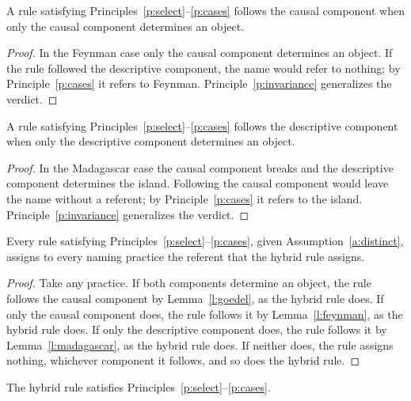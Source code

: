 \documentclass{situationist-preprint}
\begin{document}
\begin{lemma}\label{l:feynman}
A rule satisfying Principles~\ref{p:select}--\ref{p:cases} follows the causal component when only the causal component determines an object.
\end{lemma}

\begin{proof}
In the Feynman case only the causal component determines an object. If the rule followed the descriptive component, the name would refer to nothing; by Principle~\ref{p:cases} it refers to Feynman. Principle~\ref{p:invariance} generalizes the verdict.
\end{proof}

\begin{lemma}\label{l:madagascar}
A rule satisfying Principles~\ref{p:select}--\ref{p:cases} follows the descriptive component when only the descriptive component determines an object.
\end{lemma}

\begin{proof}
In the Madagascar case the causal component breaks and the descriptive component determines the island. Following the causal component would leave the name without a referent; by Principle~\ref{p:cases} it refers to the island. Principle~\ref{p:invariance} generalizes the verdict.
\end{proof}

\begin{theorem}\label{t:unique}
Every rule satisfying Principles~\ref{p:select}--\ref{p:cases}, given Assumption~\ref{a:distinct}, assigns to every naming practice the referent that the hybrid rule assigns.
\end{theorem}

\begin{proof}
Take any practice. If both components determine an object, the rule follows the causal component by Lemma~\ref{l:goedel}, as the hybrid rule does. If only the causal component does, the rule follows it by Lemma~\ref{l:feynman}, as the hybrid rule does. If only the descriptive component does, the rule follows it by Lemma~\ref{l:madagascar}, as the hybrid rule does. If neither does, the rule assigns nothing, whichever component it follows, and so does the hybrid rule.
\end{proof}

\begin{proposition}\label{p:adequate}
The hybrid rule satisfies Principles~\ref{p:select}--\ref{p:cases}.
\end{proposition}
\end{document}
